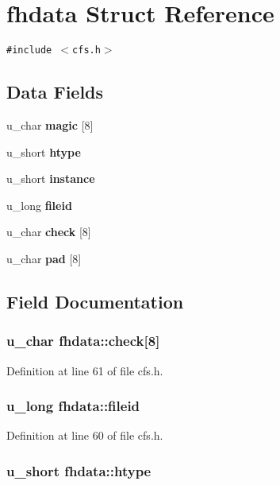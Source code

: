 \section{fhdata Struct Reference}
\label{structfhdata}
{\tt \#include $<$cfs.h$>$}

\subsection*{Data Fields}
\begin{CompactItemize}
\item 
u\_\-char {\bf magic} [8]
\item 
u\_\-short {\bf htype}
\item 
u\_\-short {\bf instance}
\item 
u\_\-long {\bf fileid}
\item 
u\_\-char {\bf check} [8]
\item 
u\_\-char {\bf pad} [8]
\end{CompactItemize}


\subsection{Field Documentation}
\subsubsection{\setlength{\rightskip}{0pt plus 5cm}u\_\-char {\bf fhdata::check}[8]}\label{structfhdata_o4}




Definition at line 61 of file cfs.h.
\subsubsection{\setlength{\rightskip}{0pt plus 5cm}u\_\-long {\bf fhdata::fileid}}\label{structfhdata_o3}




Definition at line 60 of file cfs.h.
\subsubsection{\setlength{\rightskip}{0pt plus 5cm}u\_\-short {\bf fhdata::htype}}\label{structfhdata_o1}




